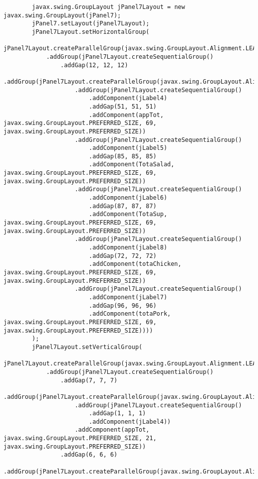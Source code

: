 \documentclass[12pt,a4paper]{article}
\begin{document}
\begin{lstlisting}
        javax.swing.GroupLayout jPanel7Layout = new javax.swing.GroupLayout(jPanel7);
        jPanel7.setLayout(jPanel7Layout);
        jPanel7Layout.setHorizontalGroup(
            jPanel7Layout.createParallelGroup(javax.swing.GroupLayout.Alignment.LEADING)
            .addGroup(jPanel7Layout.createSequentialGroup()
                .addGap(12, 12, 12)
                .addGroup(jPanel7Layout.createParallelGroup(javax.swing.GroupLayout.Alignment.LEADING)
                    .addGroup(jPanel7Layout.createSequentialGroup()
                        .addComponent(jLabel4)
                        .addGap(51, 51, 51)
                        .addComponent(appTot, javax.swing.GroupLayout.PREFERRED_SIZE, 69, javax.swing.GroupLayout.PREFERRED_SIZE))
                    .addGroup(jPanel7Layout.createSequentialGroup()
                        .addComponent(jLabel5)
                        .addGap(85, 85, 85)
                        .addComponent(TotaSalad, javax.swing.GroupLayout.PREFERRED_SIZE, 69, javax.swing.GroupLayout.PREFERRED_SIZE))
                    .addGroup(jPanel7Layout.createSequentialGroup()
                        .addComponent(jLabel6)
                        .addGap(87, 87, 87)
                        .addComponent(TotaSup, javax.swing.GroupLayout.PREFERRED_SIZE, 69, javax.swing.GroupLayout.PREFERRED_SIZE))
                    .addGroup(jPanel7Layout.createSequentialGroup()
                        .addComponent(jLabel8)
                        .addGap(72, 72, 72)
                        .addComponent(totaChicken, javax.swing.GroupLayout.PREFERRED_SIZE, 69, javax.swing.GroupLayout.PREFERRED_SIZE))
                    .addGroup(jPanel7Layout.createSequentialGroup()
                        .addComponent(jLabel7)
                        .addGap(96, 96, 96)
                        .addComponent(totaPork, javax.swing.GroupLayout.PREFERRED_SIZE, 69, javax.swing.GroupLayout.PREFERRED_SIZE))))
        );
        jPanel7Layout.setVerticalGroup(
            jPanel7Layout.createParallelGroup(javax.swing.GroupLayout.Alignment.LEADING)
            .addGroup(jPanel7Layout.createSequentialGroup()
                .addGap(7, 7, 7)
                .addGroup(jPanel7Layout.createParallelGroup(javax.swing.GroupLayout.Alignment.LEADING)
                    .addGroup(jPanel7Layout.createSequentialGroup()
                        .addGap(1, 1, 1)
                        .addComponent(jLabel4))
                    .addComponent(appTot, javax.swing.GroupLayout.PREFERRED_SIZE, 21, javax.swing.GroupLayout.PREFERRED_SIZE))
                .addGap(6, 6, 6)
                .addGroup(jPanel7Layout.createParallelGroup(javax.swing.GroupLayout.Alignment.LEADING)

\end{lstlisting}
\end{document}
